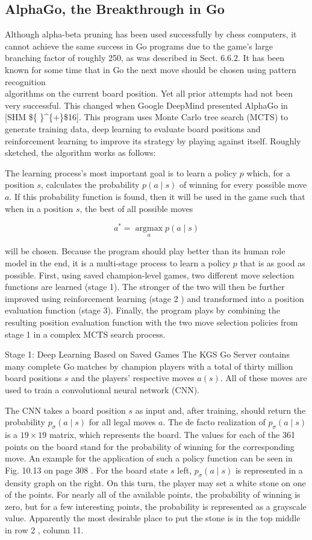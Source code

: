 \documentclass[10pt]{article}
\begin{document}
\subsection*{AlphaGo, the Breakthrough in Go}
Although alpha-beta pruning has been used successfully by chess computers, it cannot achieve the same success in Go programs due to the game's large branching factor of roughly 250, as was described in Sect. 6.6.2. It has been known for some time that in Go the next move should be chosen using pattern recognition\\[0pt]
algorithms on the current board position. Yet all prior attempts had not been very successful. This changed when Google DeepMind presented AlphaGo in [SHM \$\{ \}\^{}\{+\}\$16]. This program uses Monte Carlo tree search (MCTS) to generate training data, deep learning to evaluate board positions and reinforcement learning to improve its strategy by playing against itself. Roughly sketched, the algorithm works as follows:

The learning process's most important goal is to learn a policy $p$ which, for a position $s$, calculates the probability $p(a \mid s)$ of winning for every possible move $a$. If this probability function is found, then it will be used in the game such that when in a position $s$, the best of all possible moves

$$
a^{*}=\underset{a}{\operatorname{argmax}} p(a \mid s)
$$

will be chosen. Because the program should play better than its human role model in the end, it is a multi-stage process to learn a policy $p$ that is as good as possible. First, using saved champion-level games, two different move selection functions are learned (stage 1). The stronger of the two will then be further improved using reinforcement learning (stage 2 ) and transformed into a position evaluation function (stage 3). Finally, the program plays by combining the resulting position evaluation function with the two move selection policies from stage 1 in a complex MCTS search process.

Stage 1: Deep Learning Based on Saved Games The KGS Go Server contains many complete Go matches by champion players with a total of thirty million board positions $s$ and the players' respective moves $a(s)$. All of these moves are used to train a convolutional neural network (CNN).

The CNN takes a board position $s$ as input and, after training, should return the probability $p_{\sigma}(a \mid s)$ for all legal moves $a$. The de facto realization of $p_{\sigma}(a \mid s)$ is a $19 \times 19$ matrix, which represents the board. The values for each of the 361 points on the board stand for the probability of winning for the corresponding move. An example for the application of such a policy function can be seen in Fig. 10.13 on page 308 . For the board state $s$ left, $p_{\sigma}(a \mid s)$ is represented in a density graph on the right. On this turn, the player may set a white stone on one of the points. For nearly all of the available points, the probability of winning is zero, but for a few interesting points, the probability is represented as a grayscale value. Apparently the most desirable place to put the stone is in the top middle in row 2 , column 11.
\end{document}
